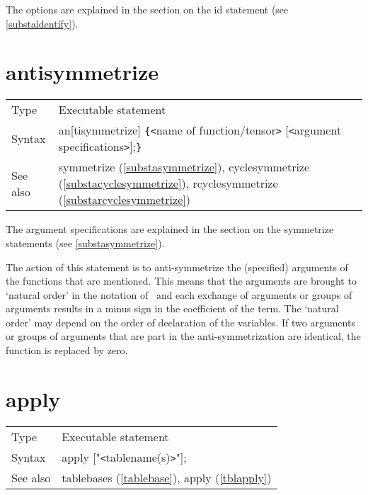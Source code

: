 \noindent The options are explained in the section on the id statement (see 
\ref{substaidentify}). \vspace{10mm}


\section{antisymmetrize}
\label{substaantisymmetrize}

\noindent \begin{tabular}{ll}
Type & Executable statement\\
Syntax & an[tisymmetrize] \verb:{:{\tt<}name of function/tensor{\tt>}
         [{\tt<}argument specifications{\tt>}];\verb:}: \\
See also & symmetrize (\ref{substasymmetrize}), cyclesymmetrize 
(\ref{substacyclesymmetrize}), rcyclesymmetrize (\ref{substarcyclesymmetrize})
\end{tabular} \vspace{4mm}

\noindent The argument specifications are explained in the section on the 
symmetrize statements (see \ref{substasymmetrize}).\medskip

\noindent The action of this statement is to 
anti-symmetrize the (specified) arguments of the functions that are 
mentioned. This means that the arguments are brought to `natural order' in 
the notation of \FORM\ and each exchange of arguments or groups of arguments 
results in a minus sign in the coefficient of the term. The `natural order' 
may depend on the order of declaration of the variables. If two arguments 
or groups of arguments that are part in the anti-symmetrization are 
identical, the function is replaced by zero. \vspace{10mm}


\section{apply}
\label{substaapply}

\noindent \begin{tabular}{ll}
Type & Executable statement\\
Syntax & apply ["{\tt<}tablename(s){\tt>}"];
\\ See also & tablebases (\ref{tablebase}), apply (\ref{tblapply})
\end{tabular} \vspace{4mm}

